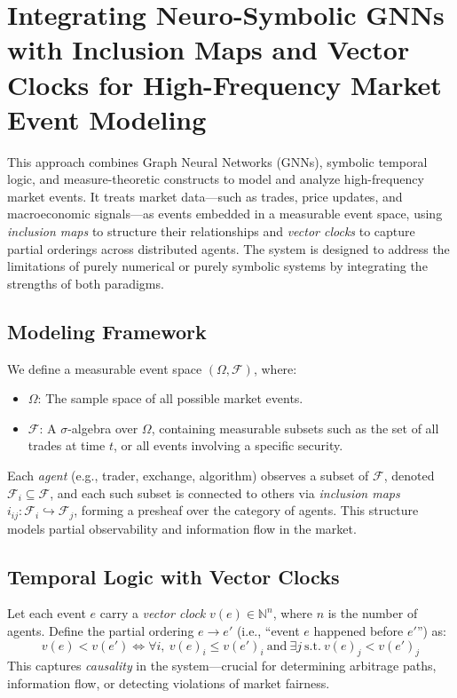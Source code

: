 \section{Integrating Neuro-Symbolic GNNs with Inclusion Maps and Vector Clocks for High-Frequency Market Event Modeling}

This approach combines Graph Neural Networks (GNNs), symbolic temporal logic, and measure-theoretic constructs to model and analyze high-frequency market events. It treats market data---such as trades, price updates, and macroeconomic signals---as events embedded in a measurable event space, using \emph{inclusion maps} to structure their relationships and \emph{vector clocks} to capture partial orderings across distributed agents. The system is designed to address the limitations of purely numerical or purely symbolic systems by integrating the strengths of both paradigms.

\subsection{Modeling Framework}

We define a measurable event space $(\Omega, \mathcal{F})$, where:
\begin{itemize}
    \item $\Omega$: The sample space of all possible market events.
    \item $\mathcal{F}$: A $\sigma$-algebra over $\Omega$, containing measurable subsets such as the set of all trades at time $t$, or all events involving a specific security.
\end{itemize}

Each \emph{agent} (e.g., trader, exchange, algorithm) observes a subset of $\mathcal{F}$, denoted $\mathcal{F}_i \subseteq \mathcal{F}$, and each such subset is connected to others via \emph{inclusion maps} $i_{ij}: \mathcal{F}_i \hookrightarrow \mathcal{F}_j$, forming a presheaf over the category of agents. This structure models partial observability and information flow in the market.

\subsection{Temporal Logic with Vector Clocks}

Let each event $e$ carry a \emph{vector clock} $v(e) \in \mathbb{N}^n$, where $n$ is the number of agents. Define the partial ordering $e \rightarrow e'$ (i.e., ``event $e$ happened before $e'$'') as:
\[
v(e) < v(e') \iff \forall i,\ v(e)_i \leq v(e')_i \ \text{and} \ \exists j \ \text{s.t.} \ v(e)_j < v(e')_j
\]
This captures \emph{causality} in the system---crucial for determining arbitrage paths, information flow, or detecting violations of market fairness.

